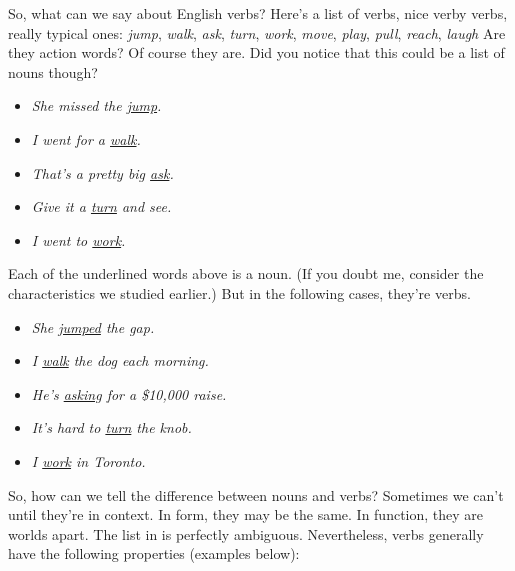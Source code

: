 So, what can we say about English verbs? Here's a list of verbs, nice verby verbs, really typical ones: 
\ea 
    \textit{jump}, \textit{walk}, \textit{ask}, \textit{turn}, \textit{work}, \textit{move}, \textit{play}, \textit{pull}, \textit{reach}, \textit{laugh} \label{ex:verblist}
\z
{}Are they action words? Of course they are. Did you notice that this could be a list of nouns though?
\begin{itemize}[noitemsep]
    \item \textit{She missed the \uline{jump}.}
    \item \textit{I went for a \uline{walk}.}
    \item \textit{That's a pretty big \uline{ask}.}
    \item \textit{Give it a \uline{turn} and see.}
    \item \textit{I went to \uline{work}.}
\end{itemize}
Each of the underlined words above is a noun. (If you doubt me, consider the characteristics we studied earlier.) But in the following cases, they're verbs.

\begin{itemize}[noitemsep]
    \item \textit{She \uline{jumped} the gap.}
    \item \textit{I \uline{walk} the dog each morning.}
    \item \textit{He's \uline{asking} for a \$10,000 raise.}
    \item \textit{It's hard to \uline{turn} the knob.}
    \item \textit{I \uline{work} in Toronto.}
\end{itemize}
So, how can we tell the difference between nouns and verbs? Sometimes we can't until they're in context. In form, they may be the same. In function, they are worlds apart. The list in  is perfectly ambiguous. Nevertheless, verbs generally have the following properties (examples below):


